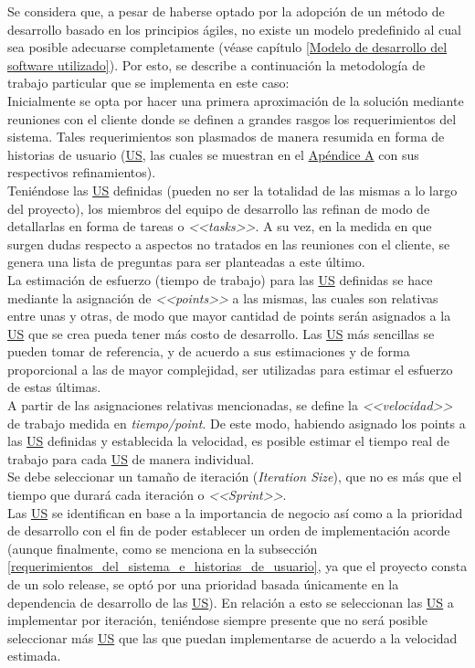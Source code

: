 \documentclass[a4paper, 12pt,twoside]{report}  %
\numberwithin{equation}{subsection} %
\begin{document}
Se considera que, a pesar de haberse optado por la adopción de un método de desarrollo basado en los principios ágiles, no existe un modelo predefinido al cual sea posible adecuarse completamente  (véase capítulo \ref{Modelo de desarrollo del software utilizado}). Por esto, se describe a continuación la metodología de trabajo particular que se implementa en este caso:\\
\indent Inicialmente se opta por hacer una primera aproximación de la solución mediante reuniones con el cliente donde se definen a grandes rasgos los requerimientos del sistema. Tales requerimientos son plasmados de manera resumida en forma de historias de usuario (\hyperlink{US}{US}, las cuales se muestran en el \hyperlink{apendice_a}{Apéndice A} con sus respectivos refinamientos).\\
\indent Teniéndose las \hyperlink{US}{US} definidas (pueden no ser la totalidad de las mismas a lo largo del proyecto), los miembros del equipo de desarrollo las refinan de modo de detallarlas en forma de tareas o \textit{<<tasks>>}. A su vez, en la medida en que surgen dudas respecto a aspectos no tratados en las reuniones con el cliente, se genera una lista de preguntas para ser planteadas a este último.\\
\indent La estimación de esfuerzo (tiempo de trabajo) para las \hyperlink{US}{US} definidas se hace mediante la asignación de \textit{<<points>>} a las mismas, las cuales son relativas entre unas y otras, de modo que mayor cantidad de points serán asignados a la \hyperlink{US}{US} que se crea pueda tener más costo de desarrollo. Las \hyperlink{US}{US} más sencillas se pueden tomar de referencia, y de acuerdo a sus estimaciones y de forma proporcional a las de mayor complejidad, ser utilizadas para estimar el esfuerzo de estas últimas.\\
\indent A partir de las asignaciones relativas mencionadas, se define la \textit{<<velocidad>>} de trabajo medida en \textit{tiempo/point}. De este modo, habiendo asignado los points a las \hyperlink{US}{US} definidas y establecida la velocidad, es posible estimar el tiempo real de trabajo para cada \hyperlink{US}{US} de manera individual.\\
\indent Se debe seleccionar un tamaño de iteración (\textit{Iteration Size}), que no es más que el tiempo que durará cada iteración o \textit{<<Sprint>>}.\\
\indent Las \hyperlink{US}{US} se identifican en base a la importancia de negocio así como a la prioridad de desarrollo con el fin de poder establecer un orden de implementación acorde (aunque finalmente, como se menciona en la subsección \ref{requerimientos_del_sistema_e_historias_de_usuario}, ya que el proyecto consta de un solo release, se optó por una prioridad basada únicamente en la dependencia de desarrollo de las \hyperlink{US}{US}). En relación a esto se seleccionan las \hyperlink{US}{US} a implementar por iteración, teniéndose siempre presente que no será posible seleccionar más \hyperlink{US}{US} que las que puedan implementarse de acuerdo a la velocidad estimada.\\
\end{document}
